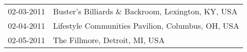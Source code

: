\begin{supertabular}{ll}
 02-03-2011 &  Buster's Billiards \& Backroom, Lexington, KY, USA \\
 02-04-2011 &  Lifestyle Communities Pavilion, Columbus, OH, USA \\
 02-05-2011 &                     The Fillmore, Detroit, MI, USA \\
\end{supertabular}
